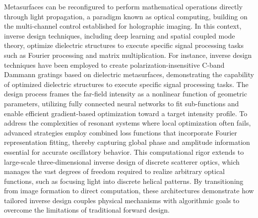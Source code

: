 Metasurfaces can be reconfigured to perform mathematical operations directly through light propagation, a paradigm known as optical computing, building on the multi-channel control established for holographic imaging. In this context, inverse design techniques, including deep learning and spatial coupled mode theory, optimize dielectric structures to execute specific signal processing tasks such as Fourier processing and matrix multiplication. For instance, inverse design techniques have been employed to create polarization-insensitive C-band Dammann gratings based on dielectric metasurfaces, demonstrating the capability of optimized dielectric structures to execute specific signal processing tasks. \citep{doi_10_1016_j_rinp_2023_106238_0ebde0ff} The design process frames the far-field intensity as a nonlinear function of geometric parameters, utilizing fully connected neural networks to fit sub-functions and enable efficient gradient-based optimization toward a target intensity profile. To address the complexities of resonant systems where local optimization often fails, advanced strategies employ combined loss functions that incorporate Fourier representation fitting, thereby capturing global phase and amplitude information essential for accurate oscillatory behavior. This computational rigor extends to large-scale three-dimensional inverse design of discrete scatterer optics, which manages the vast degrees of freedom required to realize arbitrary optical functions, such as focusing light into discrete helical patterns. By transitioning from image formation to direct computation, these architectures demonstrate how tailored inverse design couples physical mechanisms with algorithmic goals to overcome the limitations of traditional forward design. \citep{doi_10_1021_acsphotonics_4c00171_f68cb79c} \citep{doi_10_1515_nanoph_2020_0379_1cc596ab} \citep{doi_10_1117_12_2511323_41684364}

